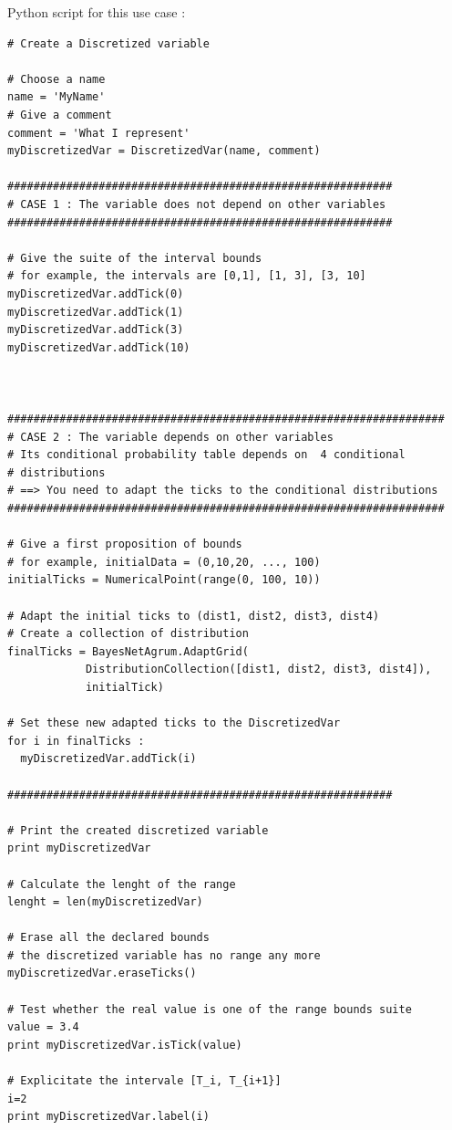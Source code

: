 \espace

Python  script for this use case :

\begin{lstlisting}
# Create a Discretized variable

# Choose a name
name = 'MyName'
# Give a comment
comment = 'What I represent'
myDiscretizedVar = DiscretizedVar(name, comment)

###########################################################
# CASE 1 : The variable does not depend on other variables
###########################################################

# Give the suite of the interval bounds
# for example, the intervals are [0,1], [1, 3], [3, 10]
myDiscretizedVar.addTick(0)
myDiscretizedVar.addTick(1)
myDiscretizedVar.addTick(3)
myDiscretizedVar.addTick(10)



###################################################################
# CASE 2 : The variable depends on other variables
# Its conditional probability table depends on  4 conditional 
# distributions
# ==> You need to adapt the ticks to the conditional distributions
###################################################################

# Give a first proposition of bounds
# for example, initialData = (0,10,20, ..., 100)
initialTicks = NumericalPoint(range(0, 100, 10))

# Adapt the initial ticks to (dist1, dist2, dist3, dist4)
# Create a collection of distribution
finalTicks = BayesNetAgrum.AdaptGrid(
            DistributionCollection([dist1, dist2, dist3, dist4]), 
            initialTick)

# Set these new adapted ticks to the DiscretizedVar
for i in finalTicks : 
  myDiscretizedVar.addTick(i)

###########################################################

# Print the created discretized variable
print myDiscretizedVar

# Calculate the lenght of the range
lenght = len(myDiscretizedVar)

# Erase all the declared bounds
# the discretized variable has no range any more
myDiscretizedVar.eraseTicks()

# Test whether the real value is one of the range bounds suite
value = 3.4
print myDiscretizedVar.isTick(value)

# Explicitate the intervale [T_i, T_{i+1}]
i=2
print myDiscretizedVar.label(i)
\end{lstlisting}




